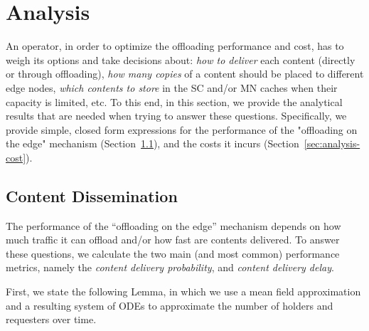 \documentclass[10pt,conference,letterpaper]{IEEEtran}
\begin{document}
\section{Analysis}\label{sec:analysis-single-content}
An operator, in order to optimize the offloading performance and cost, has to weigh its options and take decisions about: \textit{how to deliver} each content (directly or through offloading), \textit{how many copies} of a content should be placed to different edge nodes, \textit{which contents to store} in the SC and/or MN caches when their capacity is limited, etc. To this end, in this section, we provide the analytical results that are needed when trying to answer these questions. Specifically, we provide simple, closed form expressions for the performance of the "offloading on the edge" mechanism (Section~\ref{sec:single-generic}), and the costs it incurs (Section~\ref{sec:analysis-cost}).

\subsection{Content Dissemination}\label{sec:single-generic}
The performance  of the ``offloading on the edge'' mechanism depends on how much traffic it can offload and/or how fast are contents delivered. To answer these questions, we calculate the two main (and most common) performance metrics, namely the \textit{content delivery probability}, and \textit{content delivery delay}.

First, we state the following Lemma, in which we use a mean field approximation and a resulting system of ODEs to approximate the number of holders and requesters over time.
\end{document}
